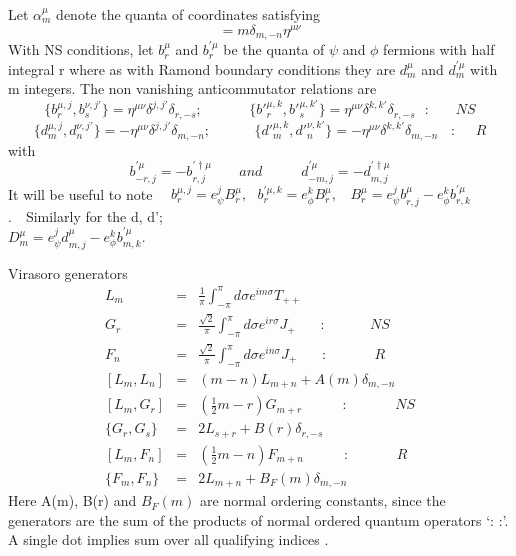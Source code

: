 \documentclass[a4paper,showpacs,preprintnumbers,amsmath,amssymb]{revtex4}
\begin{document}
Let $\alpha_m^{\mu}$ denote the quanta of coordinates satisfying
\begin{equation}
[\alpha_m^{\mu}, \alpha_n^{\nu}]=m\delta_{m,-n}\eta^{\mu\nu}
\end{equation}
With NS conditions, let $b^{\mu}_r $ and $b^{'\mu}_r$ be the quanta of $\psi$ and 
$\phi$ fermions with half integral r where as with Ramond boundary conditions 
they are $d^{\mu}_m$ and $d^{'\mu}_m$ with m integers. The non vanishing 
anticommutator relations are
\begin{equation}
\{ b^{\mu ,j}_r , b^{\nu,j'}_s\}=\eta^{\mu\nu}\delta^{j,j'}\delta_{r,-s} ;~~~~~~~~~~
~~~~~\{ b'^{\mu ,k}_r , b'^{\mu,k'}_s\}=\eta^{\mu\nu}\delta^{k,k'}\delta_{r,-s}
 ~~~:~~~~~~~~NS
\end{equation}
\begin{equation}
\{ d^{\mu ,j}_m , d^{\nu,j'}_n\}=-\eta^{\mu\nu}\delta^{j,j'}\delta_{m,-n} ;~~~~~~~~~
~~~~~\{ d'^{\mu ,k}_m, d'^{\nu,k'}_n\}=-\eta^{\mu\nu}\delta^{k,k'}\delta_{m,-n} ~~~~:~~~~~~R
\end{equation}
with
\begin{equation}
b^{\prime\mu}_{-r,j}=-b^{\prime\dag\mu}_{r,j}\;\;\;\;\;\;\; and\;\;\;\;\;\;\;\;\;\;
d^{\prime\mu}_{-m,j}=-d^{\prime\dag\mu}_{m,j}
\end{equation}
It will be useful to note ~~$ b_r^{\mu,j} = e^j_{\psi} B_r^{\mu},~~~
b_r^{\prime\mu,k} = e^k_{\phi} B_r^{\mu}, ~~~~B_r^{\mu} = 
e^j_{\psi}b_{r,j}^{\mu} - e^k_{\phi} b_{r,k}^{\prime\mu}$.~~Similarly for the d, d';\\ 
$D_m^{\mu} = e^j_{\psi}d_{m,j}^{\mu} - e^k_{\phi}b_{m,k}^{\prime\mu}$.

Virasoro generators~\cite{vr}
\begin{eqnarray}
L_m &=&\frac{1}{\pi}\int_{-\pi}^{\pi}d\sigma e^{im\sigma}T_{++}\\
G_r &=&\frac{\sqrt{2}}{\pi}\int_{-\pi}^{\pi}d\sigma e^{ir\sigma}J_{+} ~~~~~~~~:~~~~~~~~~~~~~~ NS\\
F_n& =&\frac{\sqrt{2}}{\pi}\int_{-\pi}^{\pi}d\sigma e^{in\sigma}J_{+}~~~~~~~~ :~~~~~~~~~~~~~~~ R\\
\left [L_m , L_n \right ]&=&(m-n)L_{m+n} +A(m)\delta_{m,-n}\\
\left [L_m , G_r \right ]&=&(\frac{1}{2}m-r)G_{m+r}~~~~~~~~~~~~~:~~~~~~~~~~~~~~~NS \\
\{ G_r , G_s \}&=&2L_{s+r} +B(r)\delta_{r,-s}\\
\left [L_m , F_n \right ]&=&(\frac{1}{2}m-n)F_{m+n}~~~~~~~~~~~~~:~~~~~~~~~~~~~~~R\\
\{F_m , F_n \}&=&2L_{m+n} +B_F(m)\delta_{m,-n}
\end{eqnarray}
Here A(m), B(r) and $B_F(m)$ are normal ordering constants, since the generators are
the sum of the products of normal ordered quantum operators `: :'. A single dot 
implies sum over all qualifying indices .
\end{document}
